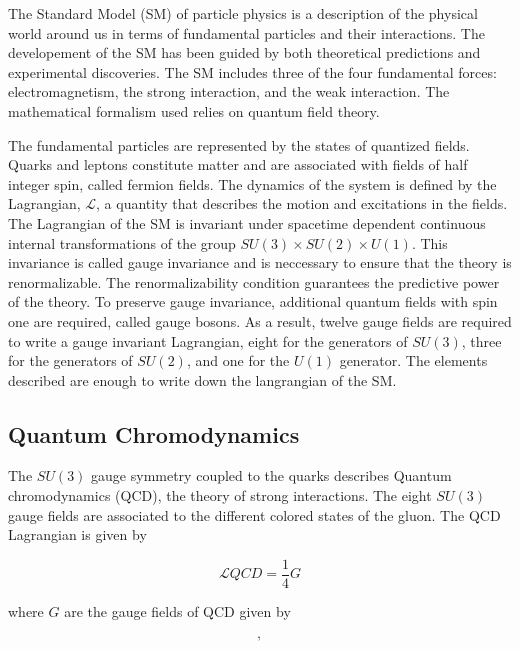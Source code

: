 The Standard Model (SM) of particle physics is a description of the physical world around us in terms of fundamental particles 
and their interactions. 
The developement of the SM has been guided by both theoretical predictions and experimental discoveries.
The SM includes three of the four fundamental forces: electromagnetism, the strong interaction, and the weak interaction.
The mathematical formalism used relies on quantum field theory. %

The fundamental particles are represented by the states of quantized fields.
Quarks and leptons constitute matter and are associated with fields of half integer spin, called fermion fields.
The dynamics of the system is defined by the Lagrangian, $\mathcal{L}$, a quantity that describes the motion and excitations 
in the fields.
The Lagrangian of the SM is invariant under spacetime dependent continuous internal transformations of the group 
$ SU\left(3\right) \times SU\left(2\right) \times U\left(1\right) $.
This invariance is called gauge invariance and is neccessary to ensure that the theory is renormalizable.
The renormalizability condition guarantees the predictive power of the theory.
To preserve gauge invariance, additional quantum fields with spin one are required, called gauge bosons.
As a result, twelve gauge fields are required to write a gauge invariant Lagrangian, 
 eight for the generators of $ SU\left(3\right) $, three for the generators of $SU\left(2\right)$, 
and one for the $U\left(1\right)$ generator.
The elements described are enough to write down the langrangian of the SM.

\subsection{Quantum Chromodynamics}

The $ SU\left(3\right) $ gauge symmetry coupled to the quarks describes Quantum chromodynamics (QCD), the theory of strong interactions.
The eight $ SU\left(3\right) $ gauge fields are associated to the different colored states of the gluon.
The QCD Lagrangian is given by

\begin{equation}
\mathcal{L} QCD = \frac{1}{4} G
\end{equation}

where $G$ are the gauge fields of QCD given by 

\begin{equation}
,
\end{equation}

